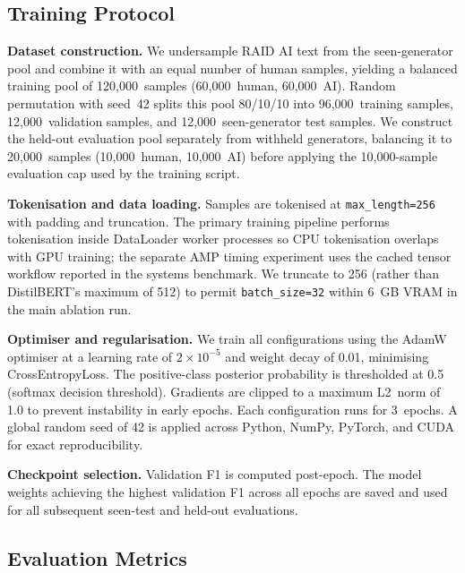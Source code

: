 \documentclass[conference]{IEEEtran}
\begin{document}
\subsection{Training Protocol}

\textbf{Dataset construction.} We undersample RAID AI text from the seen-generator
pool and combine it with an equal number of human samples, yielding a balanced
training pool of 120,000~samples (60,000~human, 60,000~AI). Random permutation
with seed~42 splits this pool 80/10/10 into 96,000~training samples,
12,000~validation samples, and 12,000~seen-generator test samples. We construct
the held-out evaluation pool separately from withheld generators, balancing it to
20,000~samples (10,000~human, 10,000~AI) before applying the 10,000-sample
evaluation cap used by the training script.

\textbf{Tokenisation and data loading.} Samples are tokenised at
\texttt{max\_length=256} with padding and truncation. The primary training
pipeline performs tokenisation inside DataLoader worker processes so CPU
tokenisation overlaps with GPU training; the separate AMP timing experiment uses
the cached tensor workflow reported in the systems benchmark. We truncate to 256
(rather than DistilBERT's maximum of 512) to permit \texttt{batch\_size=32}
within 6~GB VRAM in the main ablation run.

\textbf{Optimiser and regularisation.} We train all configurations using the
AdamW optimiser at a learning rate of $2 \times 10^{-5}$ and weight decay of 0.01,
minimising CrossEntropyLoss. The positive-class posterior probability is thresholded at 0.5 (softmax decision threshold). Gradients are clipped
to a maximum L2~norm of 1.0 to prevent instability in early epochs. Each
configuration runs for 3~epochs. A global random seed of 42 is applied across
Python, NumPy, PyTorch, and CUDA for exact reproducibility.

\textbf{Checkpoint selection.} Validation F1 is computed post-epoch. The model
weights achieving the highest validation F1 across all epochs are saved and
used for all subsequent seen-test and held-out evaluations.

\subsection{Evaluation Metrics}
\end{document}
